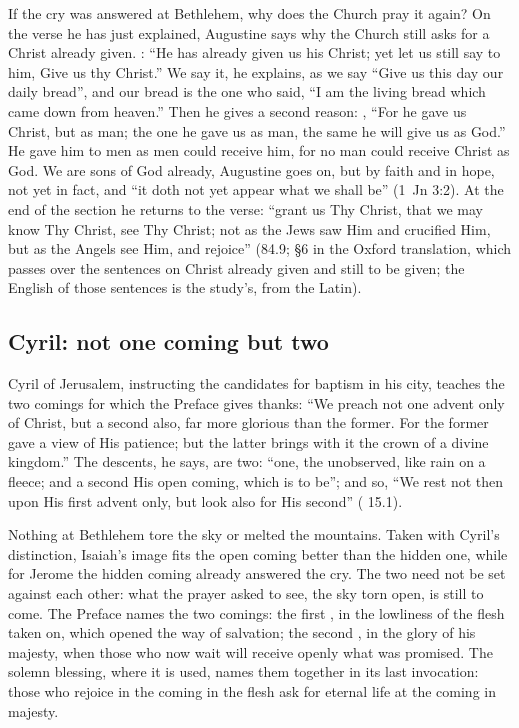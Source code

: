 If the cry was answered at Bethlehem, why does the Church pray it again?
On the verse he has just explained, Augustine says why the Church still asks
for a Christ already given. : ``He has already given us his Christ; yet let us still say to him,
Give us thy Christ.'' We say it, he explains, as we say ``Give us this day our
daily bread'', and our bread is the one who said, ``I am the living bread
which came down from heaven.'' Then he gives a second reason: , ``For he gave us Christ, but as man; the one he gave us as
man, the same he will give us as God.'' He gave him to men as men could
receive him, for no man could receive Christ as God. We are sons of God
already, Augustine goes on, but by faith and in hope, not yet in fact, and
``it doth not yet appear what we shall be'' (1~Jn 3:2). At the end of the
section he returns to the verse: ``grant us Thy Christ, that we may know Thy
Christ, see Thy Christ; not as the Jews saw Him and crucified Him, but as the
Angels see Him, and rejoice'' (84.9; §6 in the Oxford translation, which
passes over the sentences on Christ already given and still to be given; the
English of those sentences is the study's, from the Latin).

\subsection{Cyril: not one coming but two}

Cyril of Jerusalem, instructing the candidates for baptism in his city,
teaches the two comings for which the Preface gives thanks: ``We preach not one
advent only of Christ, but a second also, far more glorious than the former.
For the former gave a view of His patience; but the latter brings with it the
crown of a divine kingdom.'' The descents, he says, are two: ``one, the
unobserved, like rain on a fleece; and a second His open coming, which is to
be''; and so, ``We rest not then upon His first advent only, but look also
for His second'' ( 15.1).

Nothing at Bethlehem tore the sky or melted the mountains. Taken with Cyril's
distinction, Isaiah's image fits the open coming better than the hidden one,
while for Jerome the hidden coming already answered the cry. The two need not
be set against each other: what the prayer asked to see, the sky torn open,
is still to come. The Preface names the two
comings: the first ,
in the lowliness of the flesh taken on, which opened the way of salvation;
the second , in the glory of his majesty,
when those who now wait will receive openly what was promised. The solemn
blessing, where it is used, names them together in its last invocation:
those who rejoice in the coming in the flesh ask for eternal life at the
coming in majesty.

